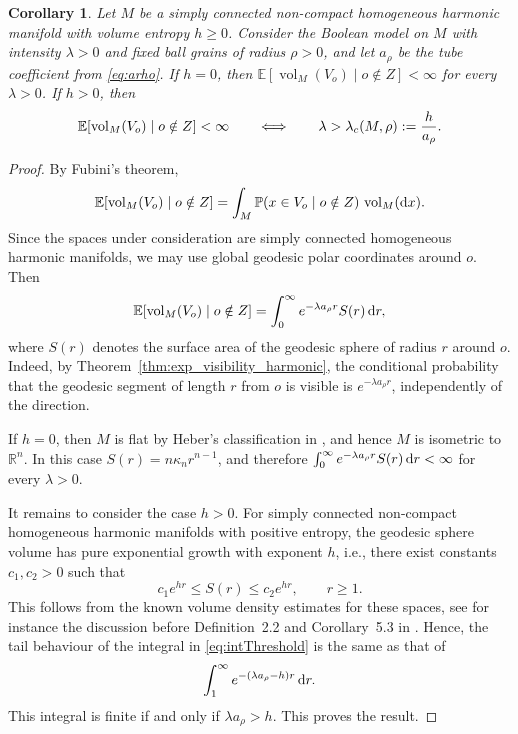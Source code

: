 \documentclass[11pt,a4paper]{article}
\theoremstyle{plain}
\newtheorem{corollary}[theorem]{Corollary}
\theoremstyle{definition}
\theoremstyle{remark}
\newcommand{\dint}{\textup{d}}
\newcommand{\vol}{\mathop{\mathrm{vol}}\nolimits}
\def\EE{\mathbb{E}}
\def\PP{\mathbb{P}}
\def\RR{\mathbb{R}}
\begin{document}
\begin{corollary}\label{cor}
	Let \(M\) be a simply connected non-compact homogeneous harmonic manifold
	with volume entropy \(h\geq 0\). Consider the Boolean model on \(M\) with
	intensity \(\lambda>0\) and fixed ball grains of radius \(\rho>0\), and let
	\(a_\rho\) be the tube coefficient from \eqref{eq:arho}. If \(h=0\), then $\EE[\vol_M(V_o)\mid o\notin Z]<\infty$ for every $\lambda>0$.
	If \(h>0\), then
	\[
	\EE[\vol_M(V_o)\mid o\notin Z]<\infty
	\qquad\Longleftrightarrow\qquad
	\lambda>\lambda_c(M,\rho):={h\over a_\rho}.
	\]
\end{corollary}
\begin{proof}
	By Fubini's theorem,
	\[
	\EE[\vol_M(V_o)\mid o\notin Z]
	=
	\int_M
	\PP(x\in V_o\mid o\notin Z)\,\vol_M(\dint x).
	\]
	Since the spaces
	under consideration are simply connected homogeneous harmonic manifolds, we may
	use global geodesic polar coordinates around \(o\). Then
	\begin{equation}\label{eq:intThreshold}
	\EE[\vol_M(V_o)\mid o\notin Z]
	=
	\int_0^\infty
	e^{-\lambda a_\rho r}S(r)\,\dint r,
	\end{equation}
	where \(S(r)\) denotes the surface area of the
	geodesic sphere of radius \(r\) around \(o\). Indeed, by
	Theorem~\ref{thm:exp_visibility_harmonic}, the conditional probability that
	the geodesic segment of length \(r\) from \(o\) is visible is
	\(e^{-\lambda a_\rho r}\), independently of the direction.
	
	If \(h=0\), then \(M\) is flat by Heber's classification in \cite{HeberHarmonicHomogeneous}, and hence
	\(M\) is isometric to \(\RR^n\). In this case $S(r)=n\kappa_n r^{n-1}$,
	and therefore $\int_0^\infty e^{-\lambda a_\rho r}S(r)\,\dint r<\infty$ for every \(\lambda>0\).
	
	It remains to consider the case \(h>0\). For simply connected non-compact
	homogeneous harmonic manifolds with positive entropy, the geodesic sphere
	volume has pure exponential growth with exponent \(h\), i.e., there exist
	constants \(c_1,c_2>0\) such that
	\[
	c_1e^{hr}\leq S(r)\leq c_2e^{hr},
	\qquad r\geq 1.
	\]
	This follows from the known volume density estimates for these spaces, see
	for instance the discussion before Definition~2.2 and Corollary~5.3 in
	\cite{Knieper12}. Hence, the tail behaviour of the integral in \eqref{eq:intThreshold} is the same as that of
	\[
	\int_{1}^\infty e^{-(\lambda a_\rho-h)r}\,\dint r.
	\]
	This integral is finite if and only if \(\lambda a_\rho>h\). This proves the result.
\end{proof}
\end{document}
